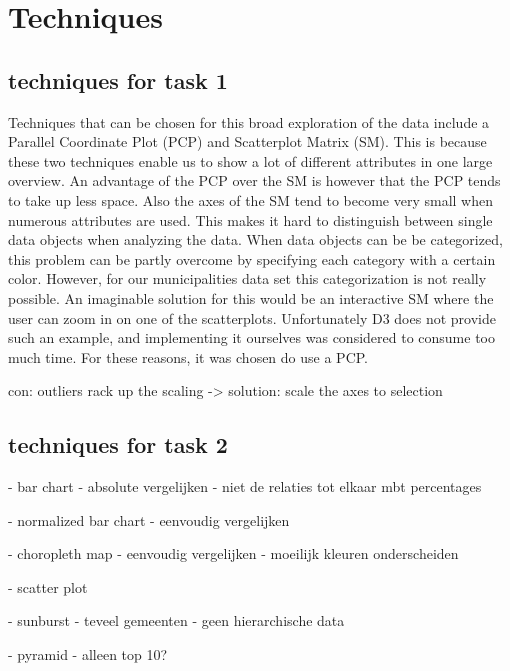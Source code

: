\section{Techniques}

\subsection{techniques for task 1}

Techniques that can be chosen for this broad exploration of the data include a Parallel Coordinate Plot (PCP) and Scatterplot Matrix (SM). This is because these two techniques enable us to show a lot of different attributes in one large overview. An advantage of the PCP over the SM is however that the PCP tends to take up less space. Also the axes of the SM tend to become very small when numerous attributes are used. This makes it hard to distinguish between single data objects when analyzing the data. When data objects can be be categorized, this problem can be partly overcome by specifying each category with a certain color. However, for our municipalities data set this categorization is not really possible. An imaginable solution for this would be an interactive SM where the user can zoom in on one of the scatterplots. Unfortunately D3 \cite{D3} does not provide such an example, and implementing it ourselves was considered to consume too much time. For these reasons, it was chosen do use a PCP.

con: outliers rack up the scaling -> solution: scale the axes to selection


\subsection{techniques for task 2}
- bar chart
 - absolute vergelijken
 - niet de relaties tot elkaar mbt percentages
 
- normalized bar chart
 - eenvoudig vergelijken
 
- choropleth map
 - eenvoudig vergelijken
 - moeilijk kleuren onderscheiden
 
- scatter plot

- sunburst
 - teveel gemeenten
 - geen hierarchische data

- pyramid
 - alleen top 10?
 
 

